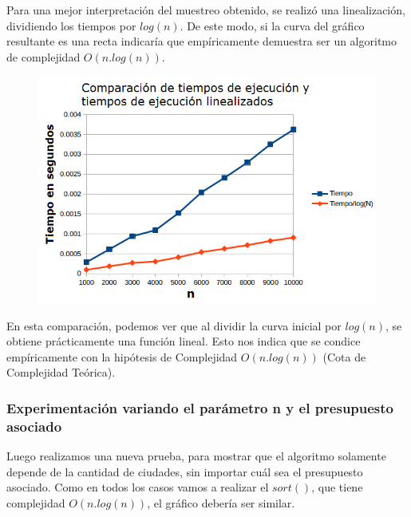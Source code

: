 Para una mejor interpretaci\'on del muestreo obtenido, se realiz\'o una linealizaci\'on, dividiendo los tiempos por $log(n)$. De este modo, si la curva del gr\'afico resultante es una recta indicar\'ia que emp\'iricamente demuestra ser un algoritmo de complejidad $O(n.log(n))$.

\newpage

 \begin{figure}[h!]
   \begin{center}
 	\includegraphics[scale=0.8]{imagenes/ej1/Mediciones/Grafico2.png}
   \end{center}
 \end{figure}

 En esta comparaci\'on, podemos ver que al dividir la curva inicial por $log(n)$, se obtiene pr\'acticamente una funci\'on lineal. Esto nos indica que se condice emp\'iricamente con la hip\'otesis de Complejidad $O(n.log(n))$ (Cota de Complejidad Te\'orica).\\
 
 \newpage
\subsubsection{Experimentaci\'on variando el par\'ametro n y el presupuesto asociado} 
 
Luego realizamos una nueva prueba, para mostrar que el algoritmo solamente depende de la cantidad de ciudades, sin importar cu\'al sea el presupuesto asociado. Como en todos los casos vamos a realizar el $sort()$, que tiene complejidad $O(n.log(n))$, el gr\'afico deber\'ia ser similar.\\


